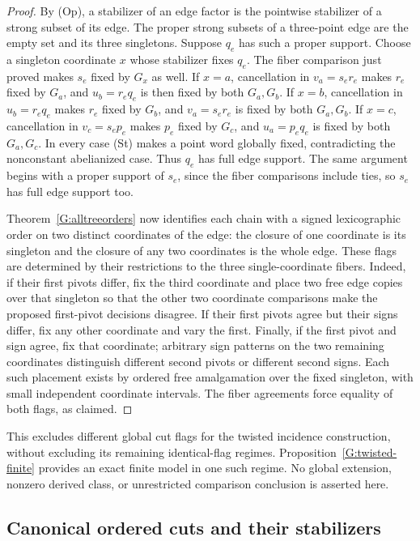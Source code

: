 \begin{proof}
By (Op), a stabilizer of an edge factor is the pointwise
stabilizer of a strong subset of its edge. The proper strong
subsets of a three-point edge are the empty set and its three
singletons. Suppose $q_e$ has such a proper support. Choose a
singleton coordinate $x$ whose stabilizer fixes $q_e$.
The fiber comparison just proved makes $s_e$ fixed by $G_x$
as well. If $x=a$, cancellation in $v_a=s_er_e$ makes $r_e$
fixed by $G_a$, and $u_b=r_eq_e$ is then fixed by both
$G_a,G_b$. If $x=b$, cancellation in $u_b=r_eq_e$ makes
$r_e$ fixed by $G_b$, and $v_a=s_er_e$ is fixed by both
$G_a,G_b$. If $x=c$, cancellation in $v_c=s_ep_e$ makes
$p_e$ fixed by $G_c$, and $u_a=p_eq_e$ is fixed by both
$G_a,G_c$. In every case (St) makes a point word globally
fixed, contradicting the nonconstant abelianized case.
Thus $q_e$ has full edge support. The same argument begins
with a proper support of $s_e$, since the fiber comparisons
include ties, so $s_e$ has full edge support too.

Theorem~\ref{G:alltreeorders} now identifies each chain with a
signed lexicographic order on two distinct coordinates of the
edge: the closure of one coordinate is its singleton and the
closure of any two coordinates is the whole edge. These flags
are determined by their restrictions to the three
single-coordinate fibers. Indeed, if their first pivots differ,
fix the third coordinate and place two free edge copies over
that singleton so that the other two coordinate comparisons
make the proposed first-pivot decisions disagree. If their
first pivots agree but their signs differ, fix any other
coordinate and vary the first. Finally, if the first pivot and
sign agree, fix that coordinate; arbitrary sign patterns on
the two remaining coordinates distinguish different second
pivots or different second signs. Each such placement exists
by ordered free amalgamation over the fixed singleton, with
small independent coordinate intervals. The fiber agreements
force equality of both flags, as claimed.
\end{proof}

This excludes different global cut flags for the twisted
incidence construction, without excluding its remaining
identical-flag regimes. Proposition~\ref{G:twisted-finite}
provides an exact finite model in one such regime. No global
extension, nonzero derived class, or unrestricted comparison
conclusion is asserted here.

\subsection{Canonical ordered cuts and their stabilizers}

